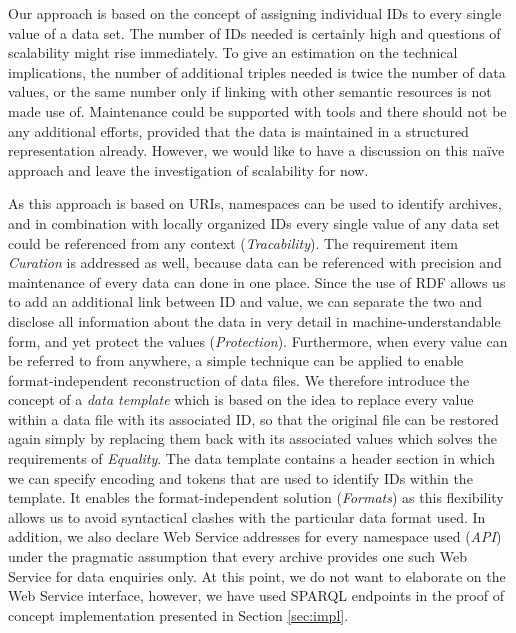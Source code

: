 \documentclass{acm_proc_article-sp}
\begin{document}
Our approach is based on the concept of assigning individual IDs to every single value of a data set.
The number of IDs needed is certainly high and questions of scalability might rise immediately.
To give an estimation on the technical implications, the number of additional triples needed is twice the number of data values, or the same number only if linking with other semantic resources is not made use of.
Maintenance could be supported with tools and there should not be any additional efforts, provided that the data is maintained in a structured representation already.
However, we would like to have a discussion on this naïve approach and leave the investigation of scalability for now.


As this approach is based on URIs, namespaces can be used to identify archives, and in combination with locally organized IDs every single value of any data set could be referenced from any context (\textit{Tracability}).
The requirement item \textit{Curation} is addressed as well, because data can be referenced with precision and maintenance of every data can done in one place. 
Since the use of RDF allows us to add an additional link between ID and value, we can separate the two and disclose all information about the data in very detail in machine-understandable form, and yet protect the values (\textit{Protection}).
Furthermore, when every value can be referred to from anywhere, a simple technique can be applied to enable format-independent reconstruction of data files.
We therefore introduce the concept of a \textit{data template} which is based on the idea to replace every value within a data file with its associated ID, so that the original file can be restored again simply by replacing them back with its associated values which solves the requirements of \textit{Equality}.
The data template contains a header section in which we can specify encoding and tokens that are used to identify IDs within the template.
It enables the format-independent solution (\textit{Formats}) as this flexibility allows us to avoid syntactical clashes with the particular data format used.
In addition, we also declare Web Service addresses for every namespace used (\textit{API}) under the pragmatic assumption that every archive provides one such Web Service for data enquiries only.
At this point, we do not want to elaborate on the Web Service interface, however, we have used SPARQL endpoints in the proof of concept implementation presented in Section \ref{sec:impl}.
\end{document}
